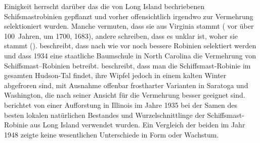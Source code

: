 \documentclass[twocolumn]{scrartcl}
\begin{document}
Einigkeit herrscht darüber das die von Long Island
bechriebenen Schifsmastrobinien gepflanzt und vorher offensichtlich
irgendwo zur Vermehrung selektioniert wurden. Manche vermuten, dass sie
aus Virginia stammt (\cite{hicks1883robinie} vor über 100~Jahren,
\cite{raber1936shipmast} um 1700, \cite{detwiler1937robinie} 1683),
andere schreiben, dass es unklar ist, woher sie stammt
(\cite{raber1938robinie}). \cite{detwiler1937robinie} beschreibt,
dass nach wie vor noch bessere Robinien selektiert werden und dass
1934 eine staatliche Baumschule in North Carolina die Vermehrung von
Schiffsmast--Robinien betreibt.
\cite{cope1938robinie} beschreibt, dass man die Schiffsmast-Robinie im
gesamten Hudson-Tal findet, ihre Wipfel jedoch in einem kalten Winter
abgefroren sind, mit Ausnahme offenbar frostharter Varianten in
Saratoga und Washington, die nach seiner Ansicht für die Vermehrung
besser geeignet sind.
\cite{minckler1948robinie} berichtet von einer Aufforstung in Illinois
im Jahre 1935 bei der Samen des besten lokalen natürlichen Bestandes
und Wurzelschnittlinge der Schiffsmast-Robinie aus Long Island
verwendet wurden. Ein Vergleich der beiden im Jahr 1948 zeigte keine
wesentlichen Unterschiede in Form oder Wachstum.
\end{document}
